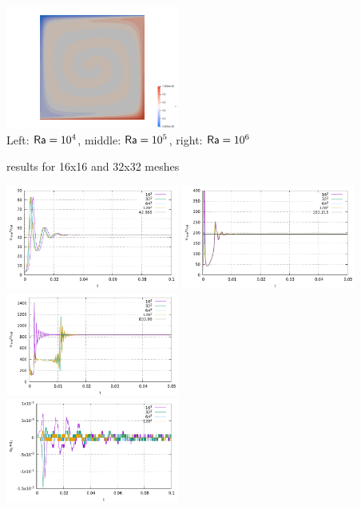 \begin{center}
\includegraphics[width=5.7cm]{python_codes/fieldstone_110/results_BA/T_Ra1e6.png}\\
{\captionfont Left: ${\mathsf{Ra}}=10^4$, middle: ${\mathsf{Ra}}=10^5$, right: ${\mathsf{Ra}}=10^6$} 
\end{center}

\newpage
\aspect results for 16x16 and 32x32 meshes

\begin{center}
\includegraphics[width=5.7cm]{python_codes/fieldstone_110/results_BA/aspect/vrms_1e4}
\includegraphics[width=5.7cm]{python_codes/fieldstone_110/results_BA/aspect/vrms_1e5}
\includegraphics[width=5.7cm]{python_codes/fieldstone_110/results_BA/aspect/vrms_1e6}\\
\includegraphics[width=5.7cm]{python_codes/fieldstone_110/results_BA/aspect/qsum_1e4}

\end{center}
